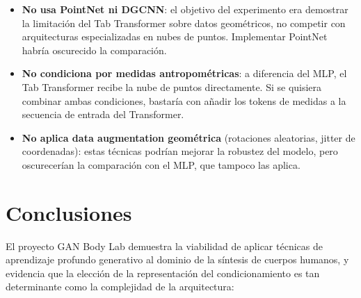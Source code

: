 \documentclass[a4paper,11pt]{article}
\begin{document}
\begin{itemize}
    \item \textbf{No usa PointNet ni DGCNN}: el objetivo del experimento
          era demostrar la limitación del Tab Transformer sobre datos
          geométricos, no competir con arquitecturas especializadas en
          nubes de puntos. Implementar PointNet habría oscurecido la
          comparación.

    \item \textbf{No condiciona por medidas antropométricas}: a diferencia
          del MLP, el Tab Transformer recibe la nube de puntos directamente.
          Si se quisiera combinar ambas condiciones, bastaría con añadir los
          tokens de medidas a la secuencia de entrada del Transformer.

    \item \textbf{No aplica data augmentation geométrica} (rotaciones
          aleatorias, jitter de coordenadas): estas técnicas podrían mejorar
          la robustez del modelo, pero oscurecerían la comparación con el
          MLP, que tampoco las aplica.
\end{itemize}

\section{Conclusiones}

El proyecto GAN Body Lab demuestra la viabilidad de aplicar técnicas de
aprendizaje profundo generativo al dominio de la síntesis de cuerpos humanos,
y evidencia que la elección de la representación del condicionamiento es
tan determinante como la complejidad de la arquitectura:
\end{document}
